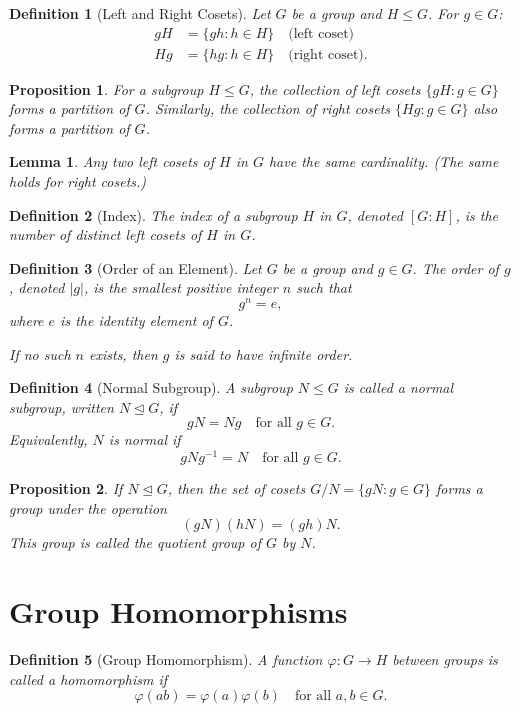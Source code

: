 \documentclass[12pt]{article}
\newtheorem{definition}{Definition}[section]
\newtheorem{lemma}{Lemma}[section]
\newtheorem{proposition}{Proposition}[section]
\begin{document}
\begin{definition}[Left and Right Cosets]
Let $G$ be a group and $H \leq G$. For $g \in G$:
\begin{align*}
    gH &= \{ gh : h \in H \} \quad \text{(left coset)} \\
    Hg &= \{ hg : h \in H \} \quad \text{(right coset)}.
\end{align*}
\end{definition}

\begin{proposition}
For a subgroup $H \leq G$, the collection of left cosets $\{ gH : g \in G \}$ forms a partition of $G$.  
Similarly, the collection of right cosets $\{ Hg : g \in G \}$ also forms a partition of $G$.
\end{proposition}

\begin{lemma}
Any two left cosets of $H$ in $G$ have the same cardinality.  
(The same holds for right cosets.)
\end{lemma}

\begin{definition}[Index]
The \emph{index} of a subgroup $H$ in $G$, denoted $[G : H]$, is the number of distinct left cosets of $H$ in $G$.
\end{definition}
\begin{definition}[Order of an Element]
Let $G$ be a group and $g \in G$.  
The \emph{order} of $g$, denoted $|g|$, is the smallest positive integer $n$ such that
\[
g^n = e,
\]
where $e$ is the identity element of $G$.  

If no such $n$ exists, then $g$ is said to have infinite order.
\end{definition}

\begin{definition}[Normal Subgroup]
A subgroup $N \leq G$ is called a \emph{normal subgroup}, written $N \trianglelefteq G$, if
\[
gN = Ng \quad \text{for all } g \in G.
\]
Equivalently, $N$ is normal if
\[
gNg^{-1} = N \quad \text{for all } g \in G.
\]
\end{definition}

\begin{proposition}
If $N \trianglelefteq G$, then the set of cosets $G/N = \{ gN : g \in G \}$ forms a group under the operation
\[
(gN)(hN) = (gh)N.
\]
This group is called the \emph{quotient group} of $G$ by $N$.
\end{proposition}

\section{Group Homomorphisms}

\begin{definition}[Group Homomorphism]
A function $\varphi : G \to H$ between groups is called a \emph{homomorphism} if
\[
\varphi(ab) = \varphi(a)\varphi(b) \quad \text{for all } a,b \in G.
\]
\end{definition}
\end{document}
